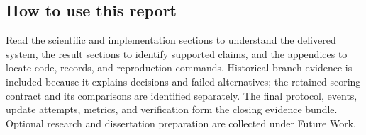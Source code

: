 \subsection{How to use this report}

Read the scientific and implementation sections to understand the delivered
system, the result sections to identify supported claims, and the appendices to
locate code, records, and reproduction commands. Historical branch evidence is
included because it explains decisions and failed alternatives; the retained
scoring contract and its comparisons are identified separately. The final protocol, events, update attempts, metrics, and verification form
the closing evidence bundle. Optional research and dissertation preparation are
collected under Future Work.
